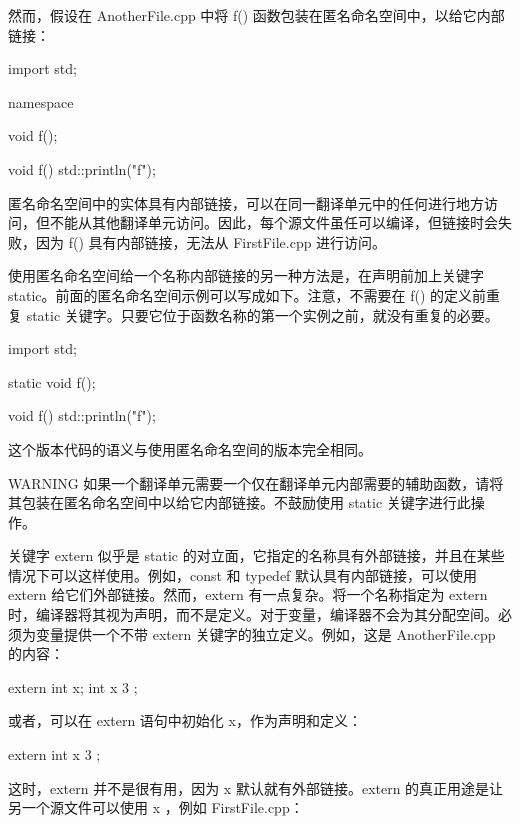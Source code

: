 然而，假设在 AnotherFile.cpp 中将 f() 函数包装在匿名命名空间中，以给它内部链接：

\begin{cpp}
import std;

namespace
{
    void f();

    void f()
    {
        std::println("f");
    }
}
\end{cpp}

匿名命名空间中的实体具有内部链接，可以在同一翻译单元中的任何进行地方访问，但不能从其他翻译单元访问。因此，每个源文件虽任可以编译，但链接时会失败，因为 f() 具有内部链接，无法从 FirstFile.cpp 进行访问。

使用匿名命名空间给一个名称内部链接的另一种方法是，在声明前加上关键字 static。前面的匿名命名空间示例可以写成如下。注意，不需要在 f() 的定义前重复 static 关键字。只要它位于函数名称的第一个实例之前，就没有重复的必要。

\begin{cpp}
import std;

static void f();

void f()
{
    std::println("f");
}
\end{cpp}

这个版本代码的语义与使用匿名命名空间的版本完全相同。

\begin{myWarning}{WARNING}
如果一个翻译单元需要一个仅在翻译单元内部需要的辅助函数，请将其包装在匿名命名空间中以给它内部链接。不鼓励使用 static 关键字进行此操作。
\end{myWarning}


关键字 extern 似乎是 static 的对立面，它指定的名称具有外部链接，并且在某些情况下可以这样使用。例如，const 和 typedef 默认具有内部链接，可以使用 extern 给它们外部链接。然而，extern 有一点复杂。将一个名称指定为 extern 时，编译器将其视为声明，而不是定义。对于变量，编译器不会为其分配空间。必须为变量提供一个不带 extern 关键字的独立定义。例如，这是 AnotherFile.cpp 的内容：

\begin{cpp}
extern int x;
int x { 3 };
\end{cpp}

或者，可以在 extern 语句中初始化 x，作为声明和定义：

\begin{cpp}
extern int x { 3 };
\end{cpp}

这时，extern 并不是很有用，因为 x 默认就有外部链接。extern 的真正用途是让另一个源文件可以使用 x ，例如 FirstFile.cpp：

